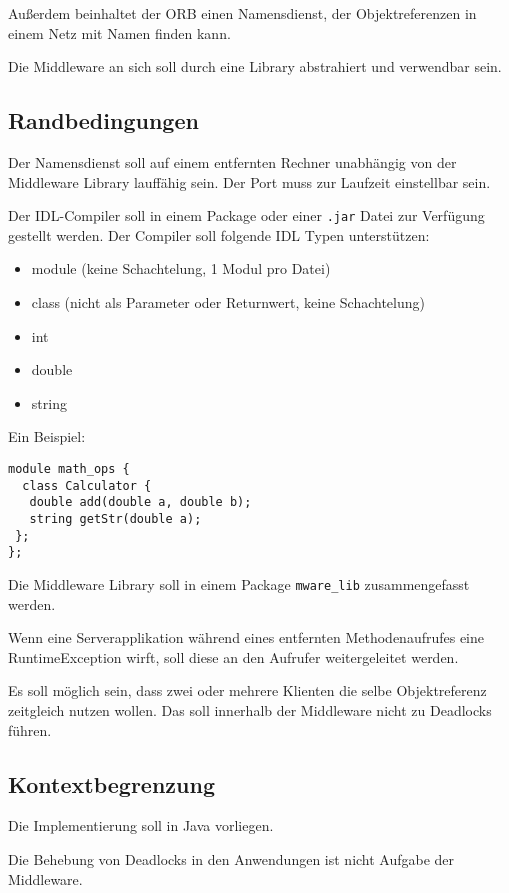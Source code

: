 \documentclass{article}
\begin{document}
Außerdem beinhaltet der ORB einen Namensdienst, der Objektreferenzen in einem Netz mit Namen finden
kann.

Die Middleware an sich soll durch eine Library abstrahiert und verwendbar sein.

\subsection{Randbedingungen}
Der Namensdienst soll auf einem entfernten Rechner unabhängig von der Middleware Library
lauffähig sein. Der Port muss zur Laufzeit einstellbar sein.

Der IDL-Compiler soll in einem Package oder einer \texttt{.jar} Datei zur Verfügung gestellt
werden. Der Compiler soll folgende IDL Typen unterstützen:

\begin{itemize}
    \item module (keine Schachtelung, 1 Modul pro Datei)
    \item class (nicht als Parameter oder Returnwert, keine Schachtelung)
    \item int
    \item double
    \item string
\end{itemize}

Ein Beispiel:
\begin{lstlisting}
module math_ops {
  class Calculator {
   double add(double a, double b);
   string getStr(double a);
 };
};
\end{lstlisting}

Die Middleware Library soll in einem Package \texttt{mware\_lib} zusammengefasst werden.

Wenn eine Serverapplikation während eines entfernten Methodenaufrufes eine RuntimeException
wirft, soll diese an den Aufrufer weitergeleitet werden.

Es soll möglich sein, dass zwei oder mehrere Klienten die selbe Objektreferenz zeitgleich
nutzen wollen. Das soll innerhalb der Middleware nicht zu Deadlocks führen.

\subsection{Kontextbegrenzung}
Die Implementierung soll in Java vorliegen.

Die Behebung von Deadlocks in den Anwendungen ist nicht Aufgabe der Middleware.

\newpage
\end{document}

